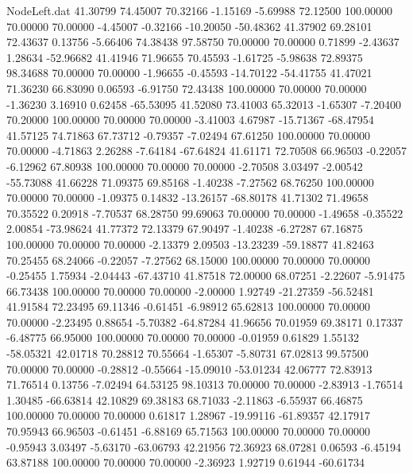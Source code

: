 \begin{filecontents}{NodeLeft.dat}
  41.30799   74.45007   70.32166    -1.15169   -5.69988   72.12500  100.00000   70.00000   70.00000   -4.45007   -0.32166  -10.20050  -50.48362
  41.37902   69.28101   72.43637     0.13756   -5.66406   74.38438   97.58750   70.00000   70.00000    0.71899   -2.43637    1.28634  -52.96682
  41.41946   71.96655   70.45593    -1.61725   -5.98638   72.89375   98.34688   70.00000   70.00000   -1.96655   -0.45593  -14.70122  -54.41755
  41.47021   71.36230   66.83090     0.06593   -6.91750   72.43438  100.00000   70.00000   70.00000   -1.36230    3.16910    0.62458  -65.53095
  41.52080   73.41003   65.32013    -1.65307   -7.20400   70.20000  100.00000   70.00000   70.00000   -3.41003    4.67987  -15.71367  -68.47954
  41.57125   74.71863   67.73712    -0.79357   -7.02494   67.61250  100.00000   70.00000   70.00000   -4.71863    2.26288   -7.64184  -67.64824
  41.61171   72.70508   66.96503    -0.22057   -6.12962   67.80938  100.00000   70.00000   70.00000   -2.70508    3.03497   -2.00542  -55.73088
  41.66228   71.09375   69.85168    -1.40238   -7.27562   68.76250  100.00000   70.00000   70.00000   -1.09375    0.14832  -13.26157  -68.80178
  41.71302   71.49658   70.35522     0.20918   -7.70537   68.28750   99.69063   70.00000   70.00000   -1.49658   -0.35522    2.00854  -73.98624
  41.77372   72.13379   67.90497    -1.40238   -6.27287   67.16875  100.00000   70.00000   70.00000   -2.13379    2.09503  -13.23239  -59.18877
  41.82463   70.25455   68.24066    -0.22057   -7.27562   68.15000  100.00000   70.00000   70.00000   -0.25455    1.75934   -2.04443  -67.43710
  41.87518   72.00000   68.07251    -2.22607   -5.91475   66.73438  100.00000   70.00000   70.00000   -2.00000    1.92749  -21.27359  -56.52481
  41.91584   72.23495   69.11346    -0.61451   -6.98912   65.62813  100.00000   70.00000   70.00000   -2.23495    0.88654   -5.70382  -64.87284
  41.96656   70.01959   69.38171     0.17337   -6.48775   66.95000  100.00000   70.00000   70.00000   -0.01959    0.61829    1.55132  -58.05321
  42.01718   70.28812   70.55664    -1.65307   -5.80731   67.02813   99.57500   70.00000   70.00000   -0.28812   -0.55664  -15.09010  -53.01234
  42.06777   72.83913   71.76514     0.13756   -7.02494   64.53125   98.10313   70.00000   70.00000   -2.83913   -1.76514    1.30485  -66.63814
  42.10829   69.38183   68.71033    -2.11863   -6.55937   66.46875  100.00000   70.00000   70.00000    0.61817    1.28967  -19.99116  -61.89357
  42.17917   70.95943   66.96503    -0.61451   -6.88169   65.71563  100.00000   70.00000   70.00000   -0.95943    3.03497   -5.63170  -63.06793
  42.21956   72.36923   68.07281     0.06593   -6.45194   63.87188  100.00000   70.00000   70.00000   -2.36923    1.92719    0.61944  -60.61734

\end{filecontents}
